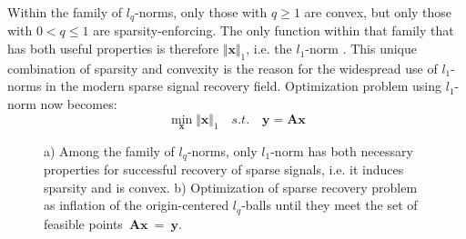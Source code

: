 \documentclass[journal]{IEEEtran}
\begin{document}
Within the family of $l_q$-norms, only those with $q\geq 1$ are convex, but only those with $0<q\leq 1$ are sparsity-enforcing. The only function within that family that has both useful properties is therefore $\Vert \boldsymbol{x}\Vert_1$, i.e. the $l_1$-norm \cite{Rish2015}. This unique combination of sparsity and convexity is the reason for the widespread use of $l_1$-norms in the modern sparse signal recovery field. Optimization problem using $l_1$-norm now becomes:
\begin{equation} \label{eq:l1_optimization}
	\min\limits_{\boldsymbol{x}}\Vert \boldsymbol{x}\Vert_1 \quad s.t. \quad \boldsymbol{y}=\boldsymbol{A} \boldsymbol{x}
\end{equation}
%
%
\begin{figure}
	\centering
	
	\caption{a) Among the family of $l_q$-norms, only $l_1$-norm has both necessary properties for successful recovery of sparse signals, i.e. it induces sparsity and is convex. b) Optimization of sparse recovery problem as inflation of the origin-centered $l_q$-balls until they meet the set of feasible points~$\boldsymbol{A}\boldsymbol{x}~=~\boldsymbol{y}$.~\cite{Rish2015}}
	\label{fig:lq_balls}
	
\end{figure}
\end{document}
